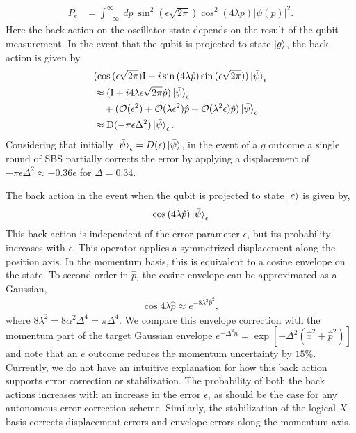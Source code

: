\documentclass[aps,prx,showpacs,notitlepage,twocolumn,superscriptaddress,nofootinbib,preprintnumbers,floatfix,10pt, longbibliography]{revtex4-2}
\begin{document}
\begin{align}
  P_e&=\int_{-\infty}^\infty \ dp \ \sin^2{(\epsilon\sqrt{2\pi})}\cos^2{(4\lambda p)}|\psi(p)|^2.
\end{align}
Here the back-action on the oscillator state depends on the result of the qubit measurement.
In the event that the qubit is projected to state $\ket{g}$, the back-action is given by 
\begin{align}
&(\cos{(\epsilon\sqrt{2\pi})}\mathrm{I}+i\sin{(4\lambda\hat p)}\sin{(\epsilon\sqrt{2\pi})})\ket{\bar\psi}_\epsilon\\
&\approx(\mathrm{I}+i4\lambda\epsilon\sqrt{2\pi}\hat p)\ket{\bar\psi}_\epsilon\nonumber\\&\quad +(\mathcal{O}(\epsilon^2)+\mathcal{O}(\lambda\epsilon^2)\hat p+\mathcal{O}(\lambda^2\epsilon)\hat p)\ket{\bar\psi}_\epsilon\\
&\approx \mathrm{D}(-\pi\epsilon\Delta^2)\ket{\bar\psi}_\epsilon.
\end{align}
Considering that initially $\ket{\bar \psi}_\epsilon = D(\epsilon)\ket{\bar \psi}$, in the event of a $g$ outcome a single round of SBS partially corrects the error by applying a displacement of $-\pi\epsilon\Delta^2\approx-0.36\epsilon$ for $\Delta=0.34$. 

The back action in the event when the qubit is projected to state $\ket{e}$ is given by,
\begin{align}
\cos{(4\lambda\hat p)}\ket{\bar\psi}_\epsilon
\end{align}
This back action is independent of the error parameter $\epsilon$, but its probability increases with $\epsilon$. This operator applies a symmetrized displacement along the position axis. In the momentum basis, this is equivalent to a cosine envelope on the state. To second order in $\hat p$, the cosine envelope can be approximated as a Gaussian,
\begin{align}
  \cos{4\lambda\hat p}\approx e^{-8\lambda^2\hat p^2},
\end{align}
where $8\lambda^2=8\alpha^2\Delta^4=\pi\Delta^4$. We compare this envelope correction with the momentum part of the target Gaussian envelope $e^{-\Delta^2\hat n}=\exp{[-\Delta^2(\hat x^2+\hat p^2)]}$ and note that an $e$ outcome reduces the momentum uncertainty by $15\%$. Currently, we do not have an intuitive explanation for how this back action supports error correction or stabilization. The probability of both the back actions increases with an increase in the error $\epsilon$, as should be the case for any autonomous error correction scheme. Similarly, the stabilization of the logical $X$ basis corrects displacement errors and envelope errors along the momentum axis.
\end{document}
